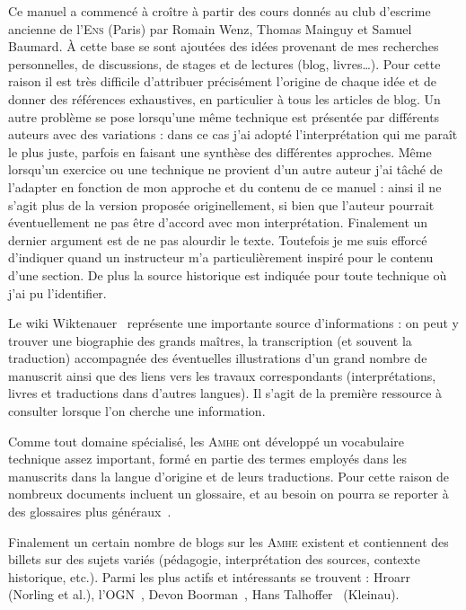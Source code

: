 Ce manuel a commencé à croître à partir des cours donnés au club d'escrime ancienne de l'\textsc{Ens} (Paris) par Romain Wenz, Thomas Mainguy et Samuel Baumard.
À cette base se sont ajoutées des idées provenant de mes recherches personnelles, de discussions, de stages et de lectures (blog, livres…).
Pour cette raison il est très difficile d'attribuer précisément l'origine de chaque idée et de donner des références exhaustives, en particulier à tous les articles de blog.
Un autre problème se pose lorsqu'une même technique est présentée par différents auteurs avec des variations : dans ce cas j'ai adopté l'interprétation qui me paraît le plus juste, parfois en faisant une synthèse des différentes approches.
Même lorsqu'un exercice ou une technique ne provient d'un autre auteur j'ai tâché de l'adapter en fonction de mon approche et du contenu de ce manuel : ainsi il ne s'agit plus de la version proposée originellement, si bien que l'auteur pourrait éventuellement ne pas être d'accord avec mon interprétation.
Finalement un dernier argument est de ne pas alourdir le texte.
Toutefois je me suis efforcé d'indiquer quand un instructeur m'a particulièrement inspiré pour le contenu d'une section.
De plus la source historique est indiquée pour toute technique où j'ai pu l'identifier.


Le wiki Wiktenauer~\cite{wiktenauer} représente une importante source d'informations : on peut y trouver une biographie des grands maîtres, la transcription (et souvent la traduction) accompagnée des éventuelles illustrations d'un grand nombre de manuscrit ainsi que des liens vers les travaux correspondants (interprétations, livres et traductions dans d'autres langues).
Il s'agit de la première ressource à consulter lorsque l'on cherche une information.

Comme tout domaine spécialisé, les \textsc{Amhe} ont développé un vocabulaire technique assez important, formé en partie des termes employés dans les manuscrits dans la langue d'origine et de leurs traductions.
Pour cette raison de nombreux documents incluent un glossaire, et au besoin on pourra se reporter à des glossaires plus généraux~\cite{Forgeng:2005:FechtkunstGlossary, FIE:2014:BrefsGlossairesLescrime, SalleArmes:2013:GlossaireEscrime}.

Finalement un certain nombre de blogs sur les \textsc{Amhe} existent et contiennent des billets sur des sujets variés (pédagogie, interprétation des sources, contexte historique, etc.).
Parmi les plus actifs et intéressants se trouvent : Hroarr~\cite{Blog:Hroarr} (Norling et al.), l'OGN~\cite{Blog:OGN}, Devon Boorman~\cite{Blog:Boorman}, Hans Talhoffer~\cite{Blog:HansTalhoffer} (Kleinau).


